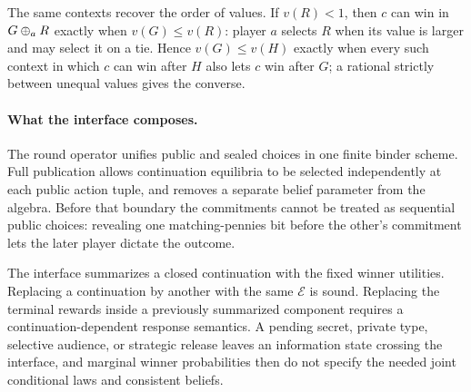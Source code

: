 The same contexts recover the order of values. If $v(R)<1$, then $c$
can win in $G\mathbin{\oplus_{a}} R$ exactly when $v(G)\leq v(R)$: player $a$ selects
$R$ when its value is larger and may select it on a tie. Hence
$v(G)\leq v(H)$ exactly when every such context in which $c$ can win
after $H$ also lets $c$ win after $G$; a rational strictly between
unequal values gives the converse.

\paragraph{What the interface composes.}
The round operator unifies public and sealed choices in one finite binder scheme. Full publication allows continuation equilibria to be selected independently at each public action tuple, and removes a separate belief parameter from the algebra. Before that boundary the commitments cannot be treated as sequential public choices: revealing one matching-pennies
bit before the other's commitment lets the later player dictate the outcome.

The interface summarizes a closed continuation with the fixed winner utilities. Replacing a continuation by another with the same $\mathcal E$ is sound. Replacing the terminal rewards inside a previously summarized component requires a continuation-dependent response semantics. A pending secret, private type, selective audience, or strategic release leaves an
information state crossing the interface, and marginal winner probabilities then do not specify the needed joint conditional laws and consistent beliefs.

